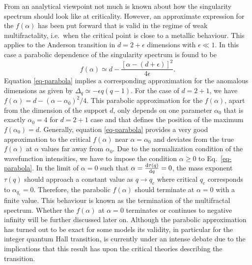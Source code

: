 From an analytical viewpoint not much is known about how the singularity spectrum should look like at criticality.  However, an approximate expression for the $f(\alpha)$ has been put forward that is valid in the regime of weak multifractality, i.e.\ when the critical point is close to a metallic behaviour.
This applies to the Anderson transition in $d=2+\epsilon$ dimensions with $\epsilon \ll 1$. In this case a parabolic dependence of the singularity spectrum is found to be \cite{Weg89}
%
\begin{equation}
 f(\alpha) \simeq d-\frac{\left[\alpha -(d+\epsilon)\right]^2}{4\epsilon}.
 \label{eq-parabola}
\end{equation}
%
Equation \eqref{eq-parabola} implies a corresponding approximation for the anomalous dimensions as given by $\Delta_q\simeq -\epsilon q(q-1)$. 
For the case of $d=2+1$, we have $f(\alpha)=d-(\alpha-\alpha_0)^2/4$.
This parabolic approximation for the $f(\alpha)$, apart from the dimension of the support $d$, only depends on one parameter $\alpha_0$ that is exactly $\alpha_0=4$ for $d=2+1$ case and that defines the position of the maximum $f(\alpha_0)=d$.  Generally, equation \eqref{eq-parabola} provides a very good approximation to the critical $f(\alpha)$ near $\alpha=\alpha_0$ and deviates from the true $f(\alpha)$ at $\alpha$ values far away from $\alpha_0$.
Due to the normalization condition of the wavefunction intensities, we have to impose the condition $\alpha\geqslant0$ to Eq.~\eqref{eq-parabola}.  In the limit of $\alpha=0$ such that $\alpha=\frac{\mathrm{d}\tau(q)}{\mathrm{d} q}=0$, the mass exponent $\tau(q)$ should approach a constant value as $q\rightarrow q_c$ where critical $q_c$ corresponds to $\alpha_{q_c}=0$.
Therefore, the parabolic $f(\alpha)$ should terminate at $\alpha=0$ with a finite value.  This behaviour is known as the termination of the multifractal spectrum.
Whether the $f(\alpha)$ at $\alpha=0$ terminates or continues to negative infinity will be further discussed later on.
Although the parabolic approximation has turned out to be exact for some models \cite{LudFSG94} its validity, in particular  for the integer quantum Hall transition, is currently under an intense debate \cite{ObuSFGL08} due to the implications that this result has upon the critical theories describing the transition.

